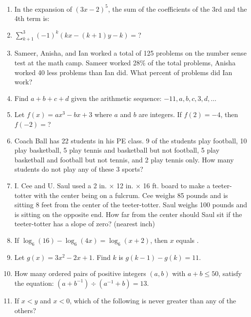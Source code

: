 \documentclass[../uilmath.tex]{subfiles}
\begin{document}
\begin{enumerate}[label=\bfseries\arabic*.]
        \item %
        In the expansion of $(3x-2)^5$, the sum of the coefficients of the 3rd and the 4th term is:

        \item %
        $\sum_{k+1}^3 (-1)^k(kx-(k+1)y-k)=$?

        \item %
        Sameer, Anisha, and Ian worked a total of 125 problems on the number sense test at the math camp.
        Sameer worked 28\% of the total problems, Anisha worked 40 less problems than Ian did. What percent of problems did Ian work?

        \item %
        Find $a+b+c+d$ given the arithmetic sequence: $-11, a,b,c,3,d,\dots$

        \item %
        Let $f(x)=ax^3-bx+3$ where $a$ and $b$ are integers. If $f(2)=-4$, then $f(-2)=$?

        \item %
        Coach Ball has 22 students in his PE class. 9 of the students play football, 10 play basketball, 5 play tennis and basketball but not football,
        5 play basketball and football but not tennis, and 2 play tennis only. How many students do not play any of these 3 sports?

        \item %
        I. Cee and U. Saul used a 2 in. $\times$ 12 in. $\times$ 16 ft. board to make a teeter-totter with the center being on a fulcrum.
        Cee weighs 85 pounds and is sitting 8 feet from the center of the teeter-totter. Saul weighs 100 pounds and is sitting on the opposite end.
        How far from the center should Saul sit if the teeter-totter has a slope of zero? (nearest inch)

        \item %
        If $\log_6(16)-\log_6(4x)=\log_6(x+2)$, then $x$ equals \blank .

        \item %
        Let $g(x)=3x^2-2x+1$. Find $k$ is $g(k-1)-g(k)=11$.

        \item %
        How many ordered pairs of positive integers $(a,b)$ with $a+b\leq 50$, satisfy the equation: $(a+b^{-1})\div (a^{-1}+b)=13$.

        \item %
        If $x<y$ and $x<0$, which of the following is never greater than any of the others?


\end{enumerate}
\end{document}
